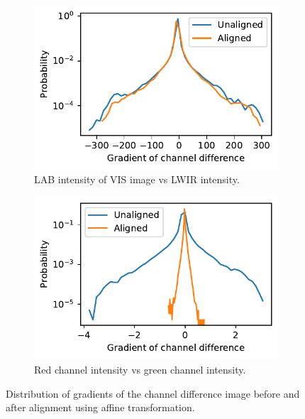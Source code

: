 \documentclass{l4proj}
\begin{document}
\begin{figure}[ht]
  \centering
  \begin{subfigure}[h!]{0.45\textwidth}
    \includegraphics[width=\textwidth]{images/registration/gradient_distribution}
    \caption{LAB intensity of VIS image vs LWIR intensity.}
    \label{fig:gradient_distribution}
  \end{subfigure}
  \begin{subfigure}[h!]{0.45\textwidth}
    \includegraphics[width=\textwidth]{images/registration/gradient_distribution_red_green}
    \caption{Red channel intensity vs green channel intensity.}
    \label{fig:gradient_distribution_red_green}
  \end{subfigure}
  \caption{Distribution of gradients of the channel difference image before and after alignment using affine transformation.}
\end{figure}
\end{document}
